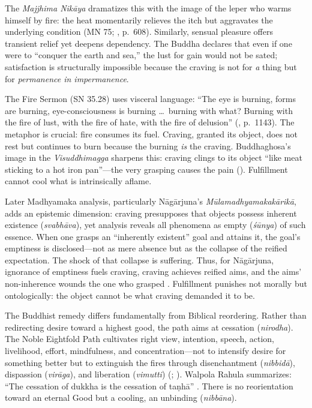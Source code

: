 The \emph{Majjhima Nikāya} dramatizes this with the image of the leper who warms himself by
fire: the heat momentarily relieves the itch but aggravates the underlying condition (MN 75;
\parencite{NanamoliBodhiMN1995}, p.~608). Similarly, sensual pleasure offers transient relief
yet deepens dependency. The Buddha declares that even if one were to ``conquer the earth and
sea,'' the lust for gain would not be sated; satisfaction is structurally impossible because
the craving is not for \emph{a} thing but for \emph{permanence in impermanence}.

The Fire Sermon (SN 35.28) uses visceral language: ``The eye is burning, forms are burning,
eye-consciousness is burning \ldots\ burning with what? Burning with the fire of lust, with
the fire of hate, with the fire of delusion'' (\parencite{BodhiSN2000}, p.~1143). The
metaphor is crucial: fire consumes its fuel. Craving, granted its object, does not rest but
continues to burn because the burning \emph{is} the craving. Buddhaghosa's image in the
\emph{Visuddhimagga} sharpens this: craving clings to its object ``like meat sticking to a hot
iron pan''---the very grasping causes the pain (\parencite{BuddhaghosaVisuddhi1956}).
Fulfillment cannot cool what is intrinsically aflame.

Later Madhyamaka analysis, particularly Nāgārjuna's \emph{Mūlamadhyamakakārikā}, adds an
epistemic dimension: craving presupposes that objects possess inherent existence
(\emph{svabhāva}), yet analysis reveals all phenomena as empty (\emph{śūnya}) of such essence.
When one grasps an ``inherently existent'' goal and attains it, the goal's emptiness is
disclosed---not as mere absence but as the collapse of the reified expectation. The shock of
that collapse is suffering. Thus, for Nāgārjuna, ignorance of emptiness fuels craving, craving
achieves reified aims, and the aims' non-inherence wounds the one who grasped
\parencite{NagarjunaMMK2013}. Fulfillment punishes not morally but ontologically: the object
cannot be what craving demanded it to be.

The Buddhist remedy differs fundamentally from Biblical reordering. Rather than redirecting
desire toward a highest good, the path aims at cessation (\emph{nirodha}). The Noble Eightfold
Path cultivates right view, intention, speech, action, livelihood, effort, mindfulness, and
concentration---not to intensify desire for something better but to extinguish the fires
through disenchantment (\emph{nibbidā}), dispassion (\emph{virāga}), and liberation
(\emph{vimutti}) (\parencite{Rahula1959}; \parencite{Gethin1998}). Walpola Rahula summarizes:
``The cessation of dukkha is the cessation of taṇhā'' \parencite{Rahula1959}. There is no
reorientation toward an eternal Good but a cooling, an unbinding (\emph{nibbāna}).

